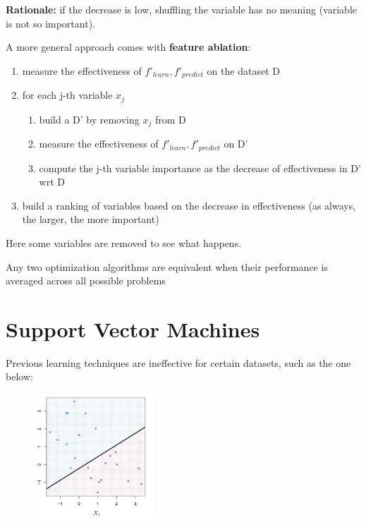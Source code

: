 \textbf{Rationale:} if the decrease is low, shuffling the variable has no meaning (variable is not so important).

A more general approach comes with \textbf{feature ablation}:
\begin{enumerate}
    \item measure the effectiveness of $f'_{learn}, f'_{predict}$ on the dataset D 
    \item for each j-th variable $x_j$
    \begin{enumerate}
        \item build a D' by removing $x_j$ from D 
        \item measure the effectiveness of $f'_{learn}, f'_{predict}$ on D' 
        \item compute the j-th variable importance as the decrease of effectiveness in D' wrt D 
    \end{enumerate}
    \item build a ranking of variables based on the decrease in effectiveness (as always, the larger, the more important)
\end{enumerate}

Here some variables are removed to see what happens.

\begin{definitionblock}
    Any two optimization algorithms are equivalent when their performance is averaged across all possible problems
\end{definitionblock}

\section{Support Vector Machines}

Previous learning techniques are ineffective for certain datasets, such as the one below:

\begin{figure}[H]
    \centering
    \includegraphics[width=0.4\textwidth]{assets/fig25.png}
\end{figure}

